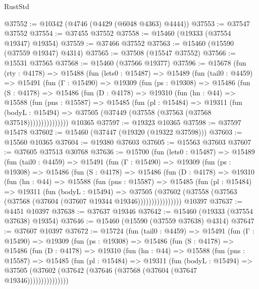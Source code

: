 \begin{lexlean}{RustStd}
\begin{coremodule}
@37552 := @10342 (@4746 (@4429 (@6048 @4363) @4444))
@37553 := @37547 @37552
@37554 := @37455 @37552
@37558 := @15460 (@19333 (@37554 @19347) @19354)
@37559 := @37466 @37552
@37563 := @15460 (@15590 (@37559 @19347) @4314)
@37565 := @37508 (@15547 @37552)
@37566 := @15531 @37565
@37568 := @15460 (@37566 @19377)
@37596 := @15678
    (fun (rty : @4178) =>
    @15488
      (fun (lets0 : @15487) =>
      @15489
        (fun (tail0 : @4459) =>
        @15491
          (fun (Γ : @15490) =>
          @19309
            (fun (ps : @19308) =>
            @15486
              (fun (S : @4178) =>
              @15486
                (fun (D : @4178) =>
                @19310
                  (fun (hn : @44) =>
                  @15588
                    (fun (pns : @15587) =>
                    @15485
                      (fun (pl : @15484) =>
                      @19311
                        (fun (bodyL : @15494) =>
                        @37505 (@37449 (@37558 (@37563 (@37568 @37518)))))))))))))))
    @10365
@37597 := @19323 @10365
@37598 := @37597 @15478
@37602 := @15460 (@37447 (@19320 (@19322 @37598)))
@37603 := @15560 @10365
@37604 := @19380 @37603
@37605 := @15563 @37603
@37607 := @37605 @37513 @30768
@37636 := @15700
    (fun (lets0 : @15487) =>
    @15489
      (fun (tail0 : @4459) =>
      @15491
        (fun (Γ : @15490) =>
        @19309
          (fun (ps : @19308) =>
          @15486
            (fun (S : @4178) =>
            @15486
              (fun (D : @4178) =>
              @19310
                (fun (hn : @44) =>
                @15588
                  (fun (pns : @15587) =>
                  @15485
                    (fun (pl : @15484) =>
                    @19311
                      (fun (bodyL : @15494) =>
                      @37505
                        (@37602
                          (@37558 (@37563 (@37568 (@37604 (@37607 @19344 @19346))))))))))))))))
    @10397
@37637 := @4451 @10397
@37638 := @37637 @19346
@37642 := @15460 (@19333 (@37554 @37638) @19354)
@37646 := @15460 (@15590 (@37559 @37638) @4314)
@37647 := @37607 @10397
@37672 := @15724
    (fun (tail0 : @4459) =>
    @15491
      (fun (Γ : @15490) =>
      @19309
        (fun (ps : @19308) =>
        @15486
          (fun (S : @4178) =>
          @15486
            (fun (D : @4178) =>
            @19310
              (fun (hn : @44) =>
              @15588
                (fun (pns : @15587) =>
                @15485
                  (fun (pl : @15484) =>
                  @19311
                    (fun (bodyL : @15494) =>
                    @37505 (@37602 (@37642 (@37646 (@37568 (@37604 (@37647 @19346)))))))))))))))

\end{coremodule}
\end{lexlean}
